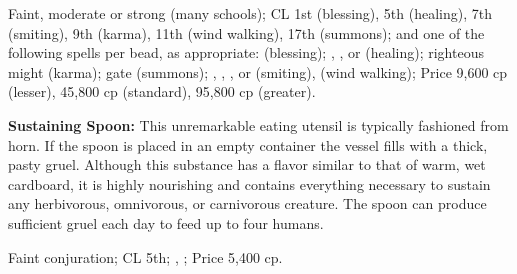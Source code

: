 Faint, moderate or strong (many schools); CL 1st (blessing), 5th (healing), 7th (smiting), 9th (karma), 11th (wind walking), 17th (summons);  and one of the following spells per bead, as appropriate:  (blessing); , , or  (healing); righteous might (karma); gate (summons); , , , or  (smiting),  (wind walking); Price 9,600 cp (lesser), 45,800 cp (standard), 95,800 cp (greater).



\textbf{Sustaining Spoon:} This unremarkable eating utensil is typically fashioned from horn. If the spoon is placed in an empty container the vessel fills with a thick, pasty gruel. Although this substance has a flavor similar to that of warm, wet cardboard, it is highly nourishing and contains everything necessary to sustain any herbivorous, omnivorous, or carnivorous creature. The spoon can produce sufficient gruel each day to feed up to four humans.

Faint conjuration; CL 5th; , ; Price 5,400 cp.








